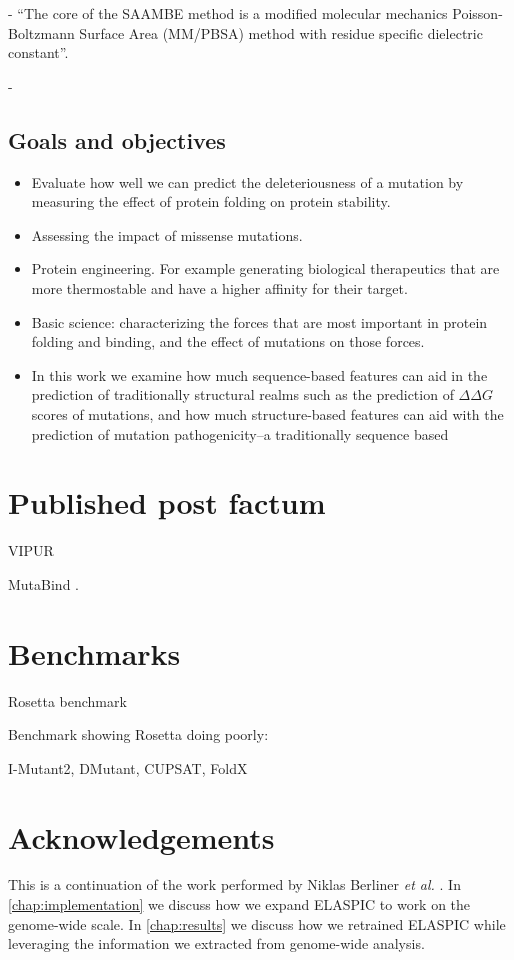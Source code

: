   - ``The core of the SAAMBE method is a modified molecular mechanics Poisson-Boltzmann Surface Area (MM/PBSA) method with residue specific dielectric constant''.

  - \cite{petukh_predicting_2015}


\subsection{Goals and objectives}

\begin{itemize}
    \item Evaluate how well we can predict the deleteriousness of a mutation by measuring the effect of protein folding on protein stability.
    \item Assessing the impact of missense mutations.
    \item Protein engineering. For example generating biological therapeutics that are more thermostable and have a higher affinity for their target.
    \item Basic science: characterizing the forces that are most important in protein folding and binding, and the effect of mutations on those forces.
    \item In this work we examine how much sequence-based features can aid in the prediction of traditionally structural realms such as the prediction of $\Delta \Delta G$ scores of mutations, and how much structure-based features can aid with the prediction of mutation pathogenicity--a traditionally sequence based
\end{itemize}



\section{Published post factum}


VIPUR \cite{baugh_robust_2016}


MutaBind \cite{li_mutabind_2016}.



\section{Benchmarks}

Rosetta benchmark \cite{o_conchuir_web_2015}

Benchmark showing Rosetta doing poorly: \cite{potapov_assessing_2009}

I-Mutant2, DMutant, CUPSAT, FoldX \cite{khan_performance_2010}



\section{Acknowledgements}

This is a continuation of the work performed by Niklas Berliner \textit{et al.} \cite{berliner_combining_2014}. In \ref{chap:implementation} we discuss how we expand ELASPIC to work on the genome-wide scale. In \ref{chap:results} we discuss how we retrained ELASPIC while leveraging the information we extracted from genome-wide analysis.
